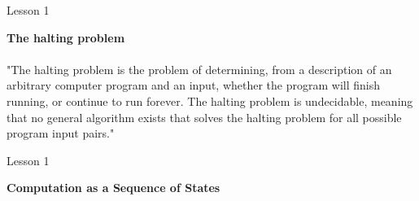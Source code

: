 \documentclass[aspectratio=1610]{beamer}
\begin{document}
\begin{frame}{Lesson 1}{}

\LARGE
\textbf{The halting problem}\\~\\
"The halting problem is the problem of determining, from a description of
an arbitrary computer program and an input, whether the program will
finish running, or continue to run forever. The halting problem is
undecidable, meaning that no general algorithm exists that solves the
halting problem for all possible program input pairs."
\end{frame}



\begin{frame}{Lesson 1}{}

\LARGE
\textbf{Computation as a Sequence of States}\\~\\

\end{frame}
\end{document}
